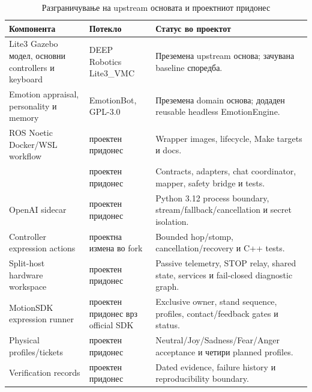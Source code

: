 \begin{table}[htbp]
\centering
\caption{Разграничување на upstream основата и проектниот придонес}
\label{tab:contributions}
\small
\begin{tabularx}{\textwidth}{L{0.28\textwidth}YY}
\toprule
\textbf{Компонента} & \textbf{Потекло} & \textbf{Статус во проектот} \\
\midrule
Lite3 Gazebo модел, основни controllers и keyboard & DEEP Robotics Lite3\_VMC & Преземена upstream основа; зачувана baseline споредба. \\
Emotion appraisal, personality и memory & EmotionBot, GPL-3.0 & Преземена domain основа; додаден reusable headless EmotionEngine. \\
ROS Noetic Docker/WSL workflow & проектен придонес & Wrapper images, lifecycle, Make targets и docs. \\
 & проектен придонес & Contracts, adapters, chat coordinator, mapper, safety bridge и tests. \\
OpenAI sidecar & проектен придонес & Python 3.12 process boundary, stream/fallback/cancellation и secret isolation. \\
Controller expression actions & проектна измена во fork & Bounded hop/stomp, cancellation/recovery и C++ tests. \\
Split-host hardware workspace & проектен придонес & Passive telemetry, STOP relay, shared state, services и fail-closed diagnostic graph. \\
MotionSDK expression runner & проектен придонес врз official SDK & Exclusive owner, stand sequence, profiles, contact/feedback gates и status. \\
Physical profiles/tickets & проектен придонес & Neutral/Joy/Sadness/Fear/Anger acceptance и четири planned profiles. \\
Verification records & проектен придонес & Dated evidence, failure history и reproducibility boundary. \\
\bottomrule
\end{tabularx}
\end{table}
